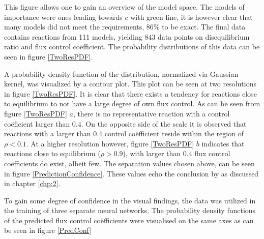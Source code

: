 This figure allows one to gain an overview of the model space. The models of importance were ones leading towards $c$ with green line, it is however clear that many models did not meet the requirements, $86\%$ to be exact. The final data contains reactions from 111 models, yielding 843 data points on disequilibrium ratio and flux control co\"efficient. The probability distributions of this data can be seen in figure \ref{TwoResPDF}.

A probability density function of the distribution, normalized via Gaussian kernel, was visualized by a contour plot. This plot can be seen at two resolutions in figure \ref{TwoResPDF}. It is clear that there exists a tendency for reactions close to equilibrium to not have a large degree of own flux control. As can be seen from figure \ref{TwoResPDF} $a$, there is no representative reaction with a control co\"eficient larger than $0.4$. On the opposite side of the scale it is observed that reactions with a larger than $0.4$ control co\"efficient reside within the region of $\rho < 0.1$. At a higher resolution however, figure \ref{TwoResPDF} $b$ indicates that reactions close to equilibrium ($\rho > 0.9$), with larger than $0.4$ flux control co\"efficients  do exist, albeit few. The \rho separation values chosen above, can be seen in figure \ref{PredictionConfidence}. These values echo the conclusion by \citeauthor{Rohwer2009} as discussed in chapter \ref{chp:2}.

To gain some degree of confidence in the visual findings, the data was utilized in the training of three separate neural networks. The probability density functions of the predicted flux control co\"efficients were visualised on the same axes as can be seen in figure \ref{PredConf}

